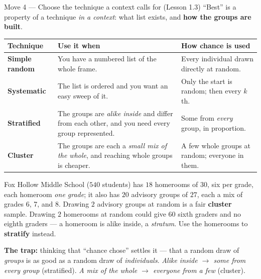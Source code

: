 \documentclass[10pt]{article}
\begin{document}
\vspace{3pt}
\boxguard[16]
\begin{notesbox}{Move 4 --- Choose the technique a context calls for (Lesson 1.3)}
\small
``Best'' is a property of a technique \emph{in a context}: what list exists, and \textbf{how
the groups are built}.

\vspace{2pt}
\renewcommand{\arraystretch}{1.25}
\begin{tabularx}{\linewidth}{@{} >{\bfseries}p{2.6cm} X X @{}}
\rowcolor{frost}
\textbf{Technique} & \textbf{Use it when} & \textbf{How chance is used} \\
\midrule
Simple random & You have a numbered list of the whole frame. & Every individual drawn
  directly at random. \\
Systematic & The list is ordered and you want an easy sweep of it. & Only the start is
  random; then every $k$th. \\
Stratified & The groups are \emph{alike inside} and differ from each other, and you need
  every group represented. & Some from \emph{every} group, in proportion. \\
Cluster & The groups are each a \emph{small mix of the whole}, and reaching whole groups is
  cheaper. & A few whole groups at random; everyone in them. \\
\end{tabularx}

\vspace{3pt}
Fox Hollow Middle School ($540$ students) has $18$ homerooms of $30$, six per grade, each
homeroom \emph{one grade}; it also has $20$ advisory groups of $27$, each a mix of grades 6, 7,
and 8. Drawing $2$ advisory groups at random is a fair \textbf{cluster} sample. Drawing $2$
homerooms at random could give $60$ sixth graders and no eighth graders --- a homeroom is alike
inside, a \emph{stratum}. Use the homerooms to \textbf{stratify} instead.

\vspace{3pt}
\textbf{The trap:} thinking that ``chance chose'' settles it --- that a random draw of
\emph{groups} is as good as a random draw of \emph{individuals}. \emph{Alike inside
$\rightarrow$ some from every group} (stratified). \emph{A mix of the whole $\rightarrow$
everyone from a few} (cluster).
\end{notesbox}
\end{document}
